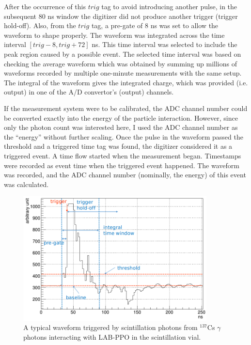 After the occurrence of this $trig$ tag to avoid introducing another pulse, in the subsequent 80 ns window the digitizer did not produce another trigger (trigger hold-off). Also, from the $trig$ tag, a pre-gate of 8 ns was set to allow the waveform to shape properly. The waveform was integrated across the time interval $[trig-8, trig+72]$ ns. This time interval was selected to include the peak region caused by a possible event. The selected time interval was based on checking the average waveform which was obtained by summing up millions of waveforms recorded by multiple one-minute measurements with the same setup. The integral of the waveform gives the integrated charge, which was provided (i.e. output) in one of the A/D convertor's (output) channels.

If the measurement system were to be calibrated, the ADC channel number could be converted exactly into the energy of the particle interaction. However, since only the photon count was interested here, I used the ADC channel number as the ``energy'' without further scaling. Once the pulse in the waveform passed the threshold and a triggered time tag was found, the digitizer considered it as a triggered event. A time flow started when the measurement began. Timestamps were recorded as event time when the triggered event happened. The waveform was recorded, and the ADC channel number (nominally, the energy) of this event was calculated.

\begin{figure}[htbp]
	\centering	
	\includegraphics[width=10cm]{teLS_waveform.png}
	\caption[A typical triggered waveform.]{A typical waveform triggered by scintillation photons from $^{137}$Cs $\gamma$ photons interacting with LAB-PPO in the scintillation vial.}
	\label{teLSwaveform}
\end{figure}

